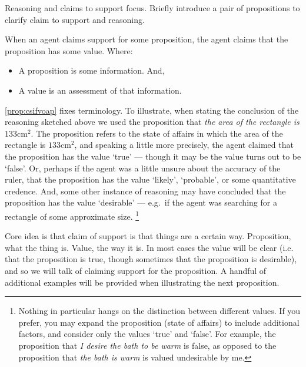 \begin{note}
  Reasoning and claims to support focus.
  Briefly introduce a pair of propositions to clarify claim to support and reasoning.

  \begin{proposition}\label{prop:csifvoap}
    When an agent claims support for some proposition, the agent claims that the proposition has some value.
    Where:
      \begin{itemize}
      \item A proposition is some information. And,
      \item A value is an assessment of that information.
      \end{itemize}
      \vspace{-\topsep}\vspace{-\topsep}
  \end{proposition}
  \autoref{prop:csifvoap} fixes terminology.
  To illustrate, when stating the conclusion of the reasoning sketched above we used the proposition that \emph{the area of the rectangle is \(133\text{cm}^{2}\)}.
  The proposition refers to the state of affairs in which the area of the rectangle is \(133\text{cm}^{2}\), and speaking a little more precisely, the agent claimed that the proposition has the value `true' --- though it may be the value turns out to be `false'.
  Or, perhaps if the agent was a little unsure about the accuracy of the ruler, that the proposition has the value `likely', `probable', or some quantitative credence.
  And, some other instance of reasoning may have concluded that the proposition has the value `desirable' --- e.g.\ if the agent was searching for a rectangle of some approximate size.\nolinebreak
  \footnote{
    Nothing in particular hangs on the distinction between different values.
    If you prefer, you may expand the proposition (state of affairs) to include additional factors, and consider only the values `true' and `false'.
    For example, the proposition that \emph{I desire the bath to be warm} is false, as opposed to the proposition that \emph{the bath is warm} is valued undesirable by me.
  }

  Core idea is that claim of support is that things are a certain way.
  Proposition, what the thing is.
  Value, the way it is.
  In most cases the value will be clear (i.e. that the proposition is true, though sometimes that the proposition is desirable), and so we will talk of claiming support for the proposition.
  A handful of additional examples will be provided when illustrating the next proposition.
\end{note}

